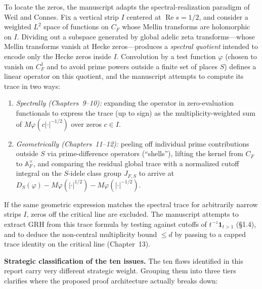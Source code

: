 \documentclass[11pt,letterpaper]{article}
\newcommand{\A}{\mathbb{A}}
\DeclareMathOperator{\RePt}{Re}
\begin{document}
To locate the zeros, the manuscript adapts the spectral-realization paradigm of Weil and Connes. Fix a vertical strip $I$ centered at $\RePt s = 1/2$, and consider a weighted $L^2$ space of functions on $C_F$ whose Mellin transforms are holomorphic on $I$. Dividing out a subspace generated by global adelic zeta transforms---whose Mellin transforms vanish at Hecke zeros---produces a \emph{spectral quotient} intended to encode only the Hecke zeros inside $I$. Convolution by a test function $\varphi$ (chosen to vanish on $C_F^1$ and to avoid prime powers outside a finite set of places $S$) defines a linear operator on this quotient, and the manuscript attempts to compute its trace in two ways:
\begin{enumerate}[leftmargin=1.6em,itemsep=1.5pt,topsep=2pt]
\item \emph{Spectrally (Chapters~9--10):} expanding the operator in zero-evaluation functionals to express the trace (up to sign) as the multiplicity-weighted sum of $M\varphi(c|\cdot|^{-1/2})$ over zeros $c\in I$.
\item \emph{Geometrically (Chapters~11--12):} peeling off individual prime contributions outside $S$ via prime-difference operators (``shells''), lifting the kernel from $C_F$ to $\A_F^\times$, and comparing the residual global trace with a normalized cutoff integral on the $S$-idele class group $J_{F,S}$ to arrive at $D_S(\varphi) - M\varphi(|\cdot|^{1/2}) - M\varphi(|\cdot|^{-1/2})$.
\end{enumerate}
If the same geometric expression matches the spectral trace for arbitrarily narrow strips $I$, zeros off the critical line are excluded. The manuscript attempts to extract GRH from this trace formula by testing against cutoffs of $t^{-z}\mathbf{1}_{t>1}$ (\S1.4), and to deduce the non-central multiplicity bound $\le d$ by passing to a capped trace identity on the critical line (Chapter~13).

\textbf{Strategic classification of the ten issues.} The ten flaws identified in this report carry very different strategic weight. Grouping them into three tiers clarifies where the proposed proof architecture actually breaks down:
\end{document}
